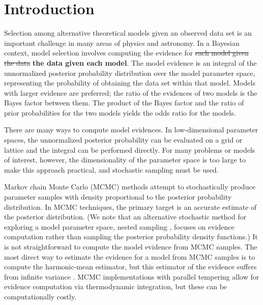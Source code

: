 \documentclass{iopart}
\newcommand{\ilya}[1]{{\color{red} \bf #1}}
\begin{document}

\submitto{\CQG}

\maketitle

\section{Introduction}

Selection among alternative theoretical models given an observed data
set is an important challenge in many areas of physics and astronomy.
In a Bayesian context, model selection involves computing the evidence
for \sout{each model given the data} \ilya{the data given each model}.  The model evidence is an integral of
the unnormalized posterior probability distribution over the model
parameter space, representing the probability of obtaining the data
set within that model.  Models with larger evidence are preferred; the
ratio of the evidences of two models is the Bayes factor between them.
The product of the Bayes factor and the ratio of prior probabilities
for the two models yields the odds ratio for the models.

There are many ways to compute model evidences.  In low-dimensional
parameter spaces, the unnormalized posterior probability can be
evaluated on a grid or lattice and the integral can be performed
directly.  For many problems or models of interest, however, the
dimensionality of the parameter space is too large to make this approach
practical, and stochastic sampling must be used.  

Markov chain Monte Carlo (MCMC) methods attempt to stochastically
produce parameter samples with density proportional to the posterior
probability distribution.  In MCMC techniques, the primary target is
an accurate estimate of the posterior distribution.  (We note that an
alternative stochastic method for exploring a model parameter space,
nested sampling \cite{Skilling:2004,Skilling:2006,Feroz:2009},
focuses on evidence computation rather than sampling the posterior
probability density functions.)  It is not straightforward to compute
the model evidence from MCMC samples.  The most direct way to estimate
the evidence for a model from MCMC samples is to compute the
harmonic-mean estimator, but this estimator of the evidence suffers
from infinite variance
\cite{NewtonRaftery:1994,Chib:1995,vanHaasteren:2009}.  MCMC
implementations with parallel tempering \cite{EarlDeem:2005} allow
for evidence computation via thermodynamic integration, but these can
be computationally costly.
\end{document}
